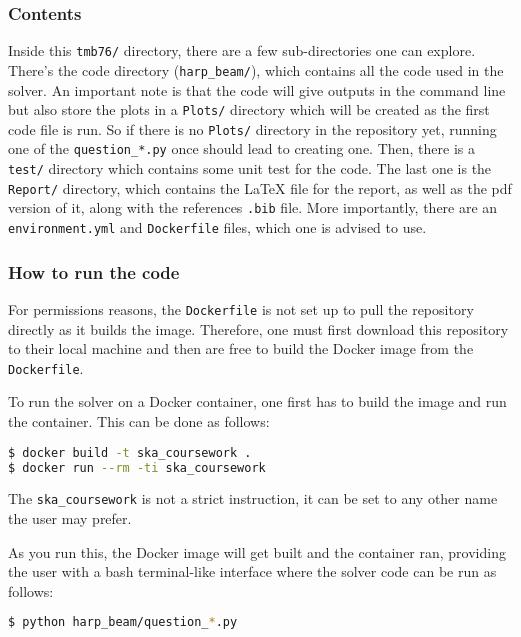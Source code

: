 \documentclass[12pt]{report} %
\begin{document}
\subsubsection{Contents}

Inside this \texttt{tmb76/} directory, there are a few sub-directories one can explore. There's the code directory (\texttt{harp\_beam/}), which contains all the code used in the solver. An important note is that the code will give outputs in the command line but also store the plots in a \texttt{Plots/} directory which will be created as the first code file is run. So if there is no \texttt{Plots/} directory in the repository yet, running one of the \texttt{question\_*.py} once should lead to creating one. Then, there is a \texttt{test/} directory which contains some unit test for the code. The last one is the \texttt{Report/} directory, which contains the LaTeX file for the report, as well as the pdf version of it, along with the references \texttt{.bib} file.
More importantly, there are an \texttt{environment.yml} and \texttt{Dockerfile} files, which one is advised to use.

\subsubsection{How to run the code}

For permissions reasons, the \texttt{Dockerfile} is not set up to pull the repository directly as it builds the image. Therefore, one must first download this repository to their local machine and then are free to build the Docker image from the \texttt{Dockerfile}.

To run the solver on a Docker container, one first has to build the image and run the container. This can be done as follows:

\begin{lstlisting}[language=bash, caption={Building the Docker image and running the container.}]
$ docker build -t ska_coursework .
$ docker run --rm -ti ska_coursework
\end{lstlisting}

The \texttt{ska\_coursework} is not a strict instruction, it can be set to any other name the user may prefer.

As you run this, the Docker image will get built and the container ran, providing the user with a bash terminal-like interface where the solver code can be run as follows:

\begin{lstlisting}[language=bash, caption={Running the code.}]
  $ python harp_beam/question_*.py
\end{lstlisting}
\end{document}
